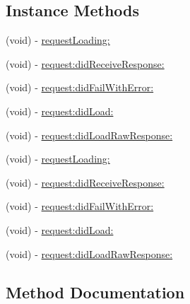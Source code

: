 \subsection*{Instance Methods}
\begin{DoxyCompactItemize}
\item 
(void) -\/ \hyperlink{protocolFBRequestDelegate_01-p_a9b63bbe739fddbe829f2560dbe53bb07}{request\+Loading\+:}
\item 
(void) -\/ \hyperlink{protocolFBRequestDelegate_01-p_a033e79b42f446a538a1a5801a67977b4}{request\+:did\+Receive\+Response\+:}
\item 
(void) -\/ \hyperlink{protocolFBRequestDelegate_01-p_af425dd2a4e632db3dee99db7e0ff6166}{request\+:did\+Fail\+With\+Error\+:}
\item 
(void) -\/ \hyperlink{protocolFBRequestDelegate_01-p_a918115a5573611db01699d77852b314d}{request\+:did\+Load\+:}
\item 
(void) -\/ \hyperlink{protocolFBRequestDelegate_01-p_a9cd54e4077012f956607aa13a887f275}{request\+:did\+Load\+Raw\+Response\+:}
\item 
(void) -\/ \hyperlink{protocolFBRequestDelegate_01-p_a9b63bbe739fddbe829f2560dbe53bb07}{request\+Loading\+:}
\item 
(void) -\/ \hyperlink{protocolFBRequestDelegate_01-p_a033e79b42f446a538a1a5801a67977b4}{request\+:did\+Receive\+Response\+:}
\item 
(void) -\/ \hyperlink{protocolFBRequestDelegate_01-p_af425dd2a4e632db3dee99db7e0ff6166}{request\+:did\+Fail\+With\+Error\+:}
\item 
(void) -\/ \hyperlink{protocolFBRequestDelegate_01-p_a918115a5573611db01699d77852b314d}{request\+:did\+Load\+:}
\item 
(void) -\/ \hyperlink{protocolFBRequestDelegate_01-p_a9cd54e4077012f956607aa13a887f275}{request\+:did\+Load\+Raw\+Response\+:}
\end{DoxyCompactItemize}


\subsection{Method Documentation}
\mbox{\label{protocolFBRequestDelegate_01-p_af425dd2a4e632db3dee99db7e0ff6166}} 
